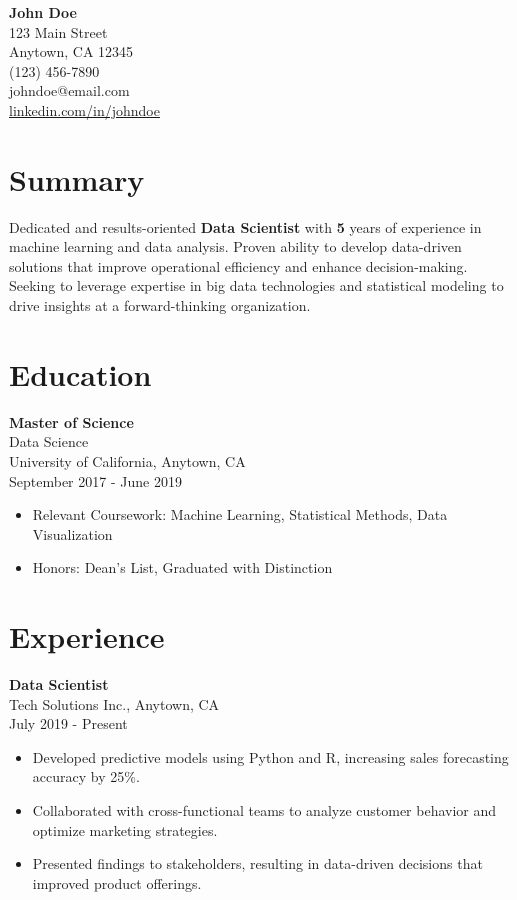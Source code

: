 \documentclass[a4paper,10pt]{article}
\begin{document}
\begin{center}
    {\LARGE \textbf{John Doe}} \\[0.5em]
    123 Main Street \\ 
    Anytown, CA 12345 \\ 
    (123) 456-7890 \\ 
    johndoe@email.com \\ 
    \href{https://linkedin.com/in/johndoe}{linkedin.com/in/johndoe}
\end{center}

\vspace{1em}

\section*{Summary}
Dedicated and results-oriented \textbf{Data Scientist} with \textbf{5} years of experience in machine learning and data analysis. Proven ability to develop data-driven solutions that improve operational efficiency and enhance decision-making. Seeking to leverage expertise in big data technologies and statistical modeling to drive insights at a forward-thinking organization.

\section*{Education}
\textbf{Master of Science} \\
Data Science \\
University of California, Anytown, CA \\
September 2017 - June 2019 \\
\begin{itemize}[left=0pt]
    \item Relevant Coursework: Machine Learning, Statistical Methods, Data Visualization
    \item Honors: Dean's List, Graduated with Distinction
\end{itemize}

\section*{Experience}
\textbf{Data Scientist} \\
Tech Solutions Inc., Anytown, CA \\
July 2019 - Present \\
\begin{itemize}[left=0pt]
    \item Developed predictive models using Python and R, increasing sales forecasting accuracy by 25\%.
    \item Collaborated with cross-functional teams to analyze customer behavior and optimize marketing strategies.
    \item Presented findings to stakeholders, resulting in data-driven decisions that improved product offerings.
\end{itemize}
\end{document}
